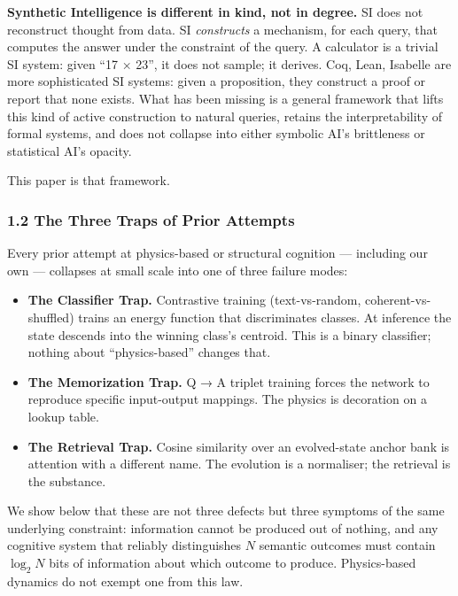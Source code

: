 \documentclass[
  11pt,
  a4paper,
]{article}
\providecommand{\tightlist}{%
  \setlength{\itemsep}{0pt}\setlength{\parskip}{0pt}}
\begin{document}
\textbf{Synthetic Intelligence is different in kind, not in degree.} SI
does not reconstruct thought from data. SI \emph{constructs} a
mechanism, for each query, that computes the answer under the constraint
of the query. A calculator is a trivial SI system: given ``17 × 23'', it
does not sample; it derives. Coq, Lean, Isabelle are more sophisticated
SI systems: given a proposition, they construct a proof or report that
none exists. What has been missing is a general framework that lifts
this kind of active construction to natural queries, retains the
interpretability of formal systems, and does not collapse into either
symbolic AI's brittleness or statistical AI's opacity.

This paper is that framework.

\subsubsection{1.2 The Three Traps of Prior
Attempts}\label{the-three-traps-of-prior-attempts}

Every prior attempt at physics-based or structural cognition ---
including our own --- collapses at small scale into one of three failure
modes:

\begin{itemize}
\tightlist
\item
  \textbf{The Classifier Trap.} Contrastive training (text-vs-random,
  coherent-vs-shuffled) trains an energy function that discriminates
  classes. At inference the state descends into the winning class's
  centroid. This is a binary classifier; nothing about ``physics-based''
  changes that.
\item
  \textbf{The Memorization Trap.} Q → A triplet training forces the
  network to reproduce specific input-output mappings. The physics is
  decoration on a lookup table.
\item
  \textbf{The Retrieval Trap.} Cosine similarity over an evolved-state
  anchor bank is attention with a different name. The evolution is a
  normaliser; the retrieval is the substance.
\end{itemize}

We show below that these are not three defects but three symptoms of the
same underlying constraint: information cannot be produced out of
nothing, and any cognitive system that reliably distinguishes \(N\)
semantic outcomes must contain \(\log_2 N\) bits of information about
which outcome to produce. Physics-based dynamics do not exempt one from
this law.
\end{document}
